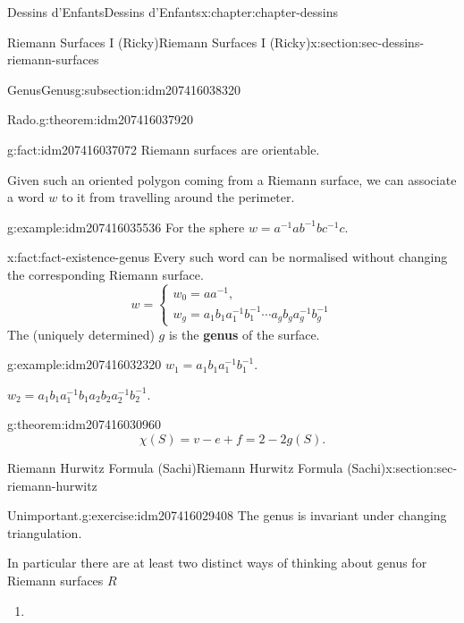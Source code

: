 \documentclass[oneside,10pt,]{book}
\newcommand{\terminology}[1]{\textbf{#1}}
\numberwithin{equation}{section}
\newcommand{\inv}{^{-1}}
\begin{document}
\begin{chapterptx}{Dessins d'Enfants}{}{Dessins d'Enfants}{}{}{x:chapter:chapter-dessins}
\begin{sectionptx}{Riemann Surfaces I (Ricky)}{}{Riemann Surfaces I (Ricky)}{}{}{x:section:sec-dessins-riemann-surfaces}
\begin{subsectionptx}{Genus}{}{Genus}{}{}{g:subsection:idm207416038320}
\begin{theorem}{Rado.}{}{g:theorem:idm207416037920}
\end{theorem}
\begin{fact}{}{}{g:fact:idm207416037072}%
Riemann surfaces are orientable.%
\end{fact}
Given such an oriented polygon coming from a Riemann surface, we can associate a word \(w\) to it from travelling around the perimeter.%
\begin{example}{}{g:example:idm207416035536}%
For the sphere \(w = a\inv ab\inv bc\inv c\).%
\end{example}
\begin{fact}{}{}{x:fact:fact-existence-genus}%
Every such word can be normalised without changing the corresponding Riemann surface.%
\begin{equation*}
w = \begin{cases} w_0 = aa\inv,\\ w_g = a_1b_1 a_1\inv b_1\inv \cdots a_gb_g a_g\inv b_g\inv\end{cases}
\end{equation*}
The (uniquely determined) \(g\) is the \terminology{genus} of the surface.%
\end{fact}
\begin{example}{}{g:example:idm207416032320}%
\(w_1 = a_1b_1 a_1\inv b_1 \inv\).%
\par
\(w_2 = a_1b_1 a_1\inv b_1a_2b_2 a_2\inv b_2 \inv\).%
\end{example}
\begin{theorem}{}{}{g:theorem:idm207416030960}%
%
\begin{equation*}
\chi (S) = v- e + f = 2-2g(S)\text{.}
\end{equation*}
%
\end{theorem}
\end{subsectionptx}
\end{sectionptx}
%
%
\typeout{************************************************}
\typeout{************************************************}
%
\begin{sectionptx}{Riemann Hurwitz Formula (Sachi)}{}{Riemann Hurwitz Formula (Sachi)}{}{}{x:section:sec-riemann-hurwitz}
\begin{inlineexercise}{Unimportant.}{g:exercise:idm207416029408}%
The genus is invariant under changing triangulation.%
\end{inlineexercise}
In particular there are at least two distinct ways of thinking about genus for Riemann surfaces \(R\)%
\begin{enumerate}
\item{}%

\end{enumerate}
\end{sectionptx}
\end{chapterptx}
\end{document}
